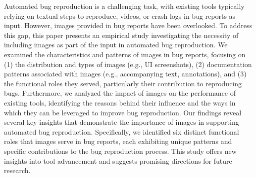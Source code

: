 %
Automated bug reproduction is a challenging task, with existing tools typically relying on textual steps-to-reproduce, videos, or crash logs in bug reports as input. However, images provided in bug reports have been overlooked.
%
To address this gap, this paper presents an empirical study investigating the necessity of including images as part of the input in automated bug reproduction. 
%
We examined the characteristics and patterns of images in bug reports, focusing on (1) the distribution and types of images (e.g., UI screenshots), (2) documentation patterns associated with images (e.g., accompanying text, annotations), and (3) the functional roles they served, particularly their contribution to reproducing bugs. 
%
Furthermore, we analyzed the impact of images on the performance of existing tools, identifying the reasons behind their influence and the ways in which they can be leveraged to improve bug reproduction.
%
Our findings reveal several key insights that demonstrate the importance of images in supporting automated bug reproduction.
%
Specifically, we identified six distinct functional roles that images serve in bug reports, each exhibiting unique patterns and specific contributions to the bug reproduction process. 
%
This study offers new insights into tool advancement and suggests promising directions for future research.





%

